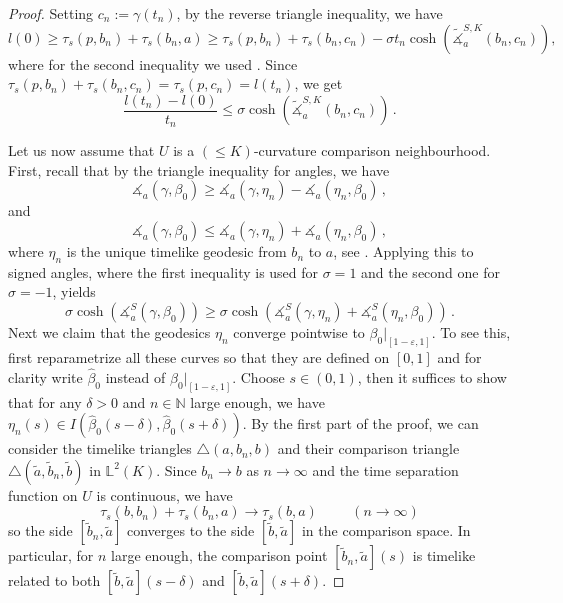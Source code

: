 \documentclass[11pt,reqno]{amsart}
\theoremstyle{definition}
\newcommand{\Cref}[1]{\zcref[S]{#1}}
\theoremstyle{definition}
\theoremstyle{plain}
\theoremstyle{remark}
\newcommand{\ma}{\measuredangle}
\begin{document}
\begin{proof}
    Setting $c_n := \gamma(t_n)$, by the reverse triangle inequality, we have 
    \begin{equation*}
        l(0)\geq\tau_s(p,b_n)+\tau_s(b_n,a)\geq\tau_s(p,b_n) + \tau_s(b_n,c_n)-\sigma t_n\cosh(\widetilde\ma_a^{S,K}(b_n,c_n)),
    \end{equation*}
    where for the second inequality we used \Cref{lem:firstvargeq}. Since $\tau_s(p,b_n)+\tau_s(b_n,c_n)=\tau_s(p,c_n)=l(t_n)$, we get
    \begin{equation}\label{eq:lhs}
        \frac{l(t_n)-l(0)}{t_n}\leq\sigma \cosh(\widetilde\ma_a^{S,K}(b_n,c_n)) \, .
    \end{equation}
    
    Let us now assume that $U$ is a $(\leq K)$-curvature comparison neighbourhood. First, recall that by the triangle inequality for angles, we have
    \begin{equation*}
        \ma_a(\gamma,\beta_0)\geq\ma_a(\gamma,\eta_n)-\ma_a(\eta_n,\beta_0)\, ,
    \end{equation*}
    and
    \begin{equation*}
        \ma_a(\gamma,\beta_0)\leq\ma_a(\gamma,\eta_n)+\ma_a(\eta_n,\beta_0) \, ,
    \end{equation*}
    where $\eta_n$ is the unique timelike geodesic from $b_n$ to $a$, see \Cref{fig: fvf setup}. Applying this to signed angles, where the first inequality is used for $\sigma=1$ and the second one for $\sigma=-1$, yields
    \begin{equation*}
        \sigma\cosh(\ma_a^S(\gamma,\beta_0))\geq\sigma\cosh(\ma_a^S(\gamma,\eta_n)+\ma_a^S(\eta_n,\beta_0)) \, .
    \end{equation*}
    Next we claim that the geodesics $\eta_n$ converge pointwise to $\beta_0\big|_{[1-\varepsilon,1]}$. To see this, first reparametrize all these curves so that they are defined on $[0,1]$ and for clarity write $\hat\beta_0$ instead of $\beta_0\big|_{[1-\varepsilon,1]}$. Choose $s\in(0,1)$, then it suffices to show that for any $\delta>0$ and $n\in\mathbb N$ large enough, we have $\eta_n(s)\in I(\hat\beta_0(s-\delta),\hat\beta_0(s+\delta))$. By the first part of the proof, we can consider the timelike triangles $\triangle(a,b_n,b)$ and their comparison triangle $\triangle(\tilde a,\tilde b_n,\tilde b)$ in $\mathbb L^2(K)$. Since $b_n\to b$ as $n\to\infty$ and the time separation function on $U$ is continuous, we have 
    \[\tau_s(b,b_n)+\tau_s(b_n,a)\to\tau_s(b,a)\hspace{1cm}(n\to\infty)\]
    so the side $[\tilde b_n,\tilde a]$ converges to the side $[\tilde b,\tilde a]$ in the comparison space. In particular, for $n$ large enough, the comparison point $[\tilde b_n,\tilde a](s)$ is timelike related to both $[\tilde b,\tilde a](s-\delta)$ and $[\tilde b,\tilde a](s+\delta)$. 

\end{proof}
\end{document}
